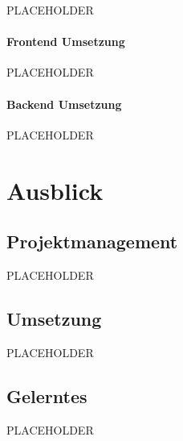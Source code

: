 PLACEHOLDER

\paragraph{Frontend Umsetzung}
\label{sec:org355e7a6}

PLACEHOLDER

\paragraph{Backend Umsetzung}
\label{sec:org263b030}

PLACEHOLDER

\section{Ausblick}
\label{sec:org4832c62}
\subsection{Projektmanagement}
\label{sec:org1794ec5}

PLACEHOLDER

\subsection{Umsetzung}
\label{sec:org1ca9bef}

PLACEHOLDER

\subsection{Gelerntes}
\label{sec:orgd179673}

PLACEHOLDER

